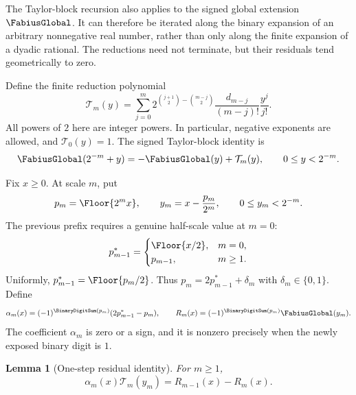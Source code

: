 \documentclass[11pt,oneside]{article}
\newtheorem{lemma}[theorem]{Lemma}
\theoremstyle{definition}
\theoremstyle{remark}
\begin{document}
The Taylor-block recursion also applies to the signed global extension $\FabiusGlobal$.  It can
therefore be iterated along the binary expansion of an arbitrary nonnegative real number,
rather than only along the finite expansion of a dyadic rational.  The reductions need not
terminate, but their residuals tend geometrically to zero.

Define the finite reduction polynomial
\begin{equation}
 \mathcal T_m(y)=
 \sum_{j=0}^{m}
 2^{\binom{j+1}{2}-\binom{m-j}{2}}
 \frac{d_{m-j}}{(m-j)!}\frac{y^j}{j!}.                   \label{eq:global-reduction-polynomial}
\end{equation}
All powers of $2$ here are integer powers.  In particular, negative exponents are allowed,
and $\mathcal T_0(y)=1$.  The signed Taylor-block identity is
\begin{equation}
 \FabiusGlobal(2^{-m}+y)=-\FabiusGlobal(y)+\mathcal T_m(y),
 \qquad 0\le y<2^{-m}.                                   \label{eq:global-taylor-reduction}
\end{equation}

Fix $x\ge0$.  At scale $m$, put
\begin{equation}
 p_m=\Floor{2^mx},\qquad
 y_m=x-\frac{p_m}{2^m},\qquad 0\le y_m<2^{-m}.            \label{eq:global-prefix-tail}
\end{equation}
The previous prefix requires a genuine half-scale value at $m=0$:
\begin{equation}
 p^*_{m-1}=\begin{cases}
  \Floor{x/2},&m=0,\\
  p_{m-1},&m\ge1.
 \end{cases}                                             \label{eq:global-previous-prefix}
\end{equation}
Uniformly, $p^*_{m-1}=\Floor{p_m/2}$.  Thus
$p_m=2p^*_{m-1}+\delta_m$ with $\delta_m\in\{0,1\}$.  Define
\begin{equation}
 \alpha_m(x)=(-1)^{\BinaryDigitSum(p_m)}(2p^*_{m-1}-p_m),\qquad
 R_m(x)=(-1)^{\BinaryDigitSum(p_m)}\FabiusGlobal(y_m).                  \label{eq:global-reduction-coefficient}
\end{equation}
The coefficient $\alpha_m$ is zero or a sign, and it is nonzero precisely when the newly
exposed binary digit is $1$.

\begin{lemma}[One-step residual identity]
For $m\ge1$,
\begin{equation}
 \alpha_m(x)\mathcal T_m(y_m)=R_{m-1}(x)-R_m(x).          \label{eq:global-one-step-residual}
\end{equation}
\end{lemma}
\end{document}
